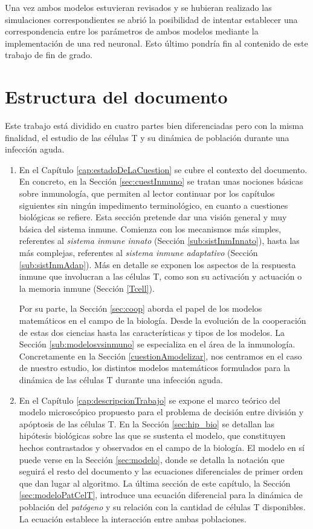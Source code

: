 Una vez ambos modelos estuvieran revisados y se hubieran realizado las simulaciones correspondientes se abrió la posibilidad de intentar establecer una correspondencia entre los parámetros de ambos modelos mediante la implementación de una red neuronal. Esto último pondría fin al contenido de este trabajo de fin de grado.


\section{Estructura del documento}

Este trabajo está dividido en cuatro partes bien diferenciadas pero con la misma finalidad, el estudio de las células T y su dinámica de población durante una infección aguda. 

\begin{enumerate}
	\item En el Capítulo \ref{cap:estadoDeLaCuestion} se cubre el contexto del documento. En concreto, en la Sección \ref{sec:cuestInmuno} se tratan unas nociones básicas sobre inmunología, que permiten al lector continuar por los capítulos siguientes sin ningún impedimento terminológico, en cuanto a cuestiones biológicas se refiere. Esta sección pretende dar una visión general y muy básica del sistema inmune. Comienza con los mecanismos más simples, referentes al \textit{sistema inmune innato} (Sección \ref{sub:sistInmInnato}), hasta las más complejas, referentes al \textit{sistema inmune adaptativo} (Sección \ref{sub:sistInmAdap}). Más en detalle se exponen los aspectos de la respuesta inmune que involucran a las células T, como son su activación y actuación o la memoria inmune (Sección \ref{Tcell}). 
	
	Por su parte, la Sección \ref{sec:coop} aborda el papel de los modelos matemáticos en el campo de la biología. Desde la evolución de la cooperación de estas dos ciencias hasta las características y tipos de los modelos. La Sección \ref{sub:modelosvsinmuno} se especializa en el área de la inmunología. Concretamente en la Sección \ref{cuestionAmodelizar}, nos centramos en el caso de nuestro estudio, los distintos modelos matemáticos formulados para la dinámica de las células T durante una infección aguda.
	 
	
	\item En el Capítulo \ref{cap:descripcionTrabajo} se expone el marco teórico del modelo microscópico propuesto para el problema de decisión entre división y apóptosis de las células T. En la Sección \ref{sec:hip_bio} se detallan las hipótesis biológicas sobre las que se sustenta el modelo, que constituyen hechos contrastados y observados en el campo de la biología. El modelo en sí puede verse en la Sección \ref{sec:modelo}, donde se detalla la notación que seguirá el resto del documento y las ecuaciones diferenciales de primer orden que dan lugar al algoritmo. La última sección de este capítulo, la Sección \ref{sec:modeloPatCelT}, introduce una ecuación diferencial para la dinámica de población del \textit{patógeno} y su relación con la cantidad de células T disponibles. La ecuación establece la interacción entre ambas poblaciones.
	

\end{enumerate}
